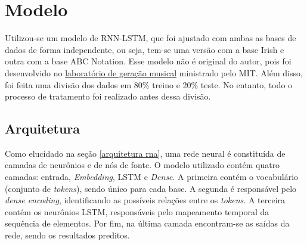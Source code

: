 \documentclass{automatextcc}
\begin{document}
\section{Modelo}
Utilizou-se um modelo de RNN-LSTM, que foi ajustado com ambas as bases de dados de forma independente, ou seja, tem-se uma versão com a base Irish e outra com a base ABC Notation. Esse modelo não é original do autor, pois foi desenvolvido no \href{https://goodboychan.github.io/python/tensorflow/mit/2021/02/14/music-generation.html\#The-Recurrent-Neural-Network-(RNN)-model}{laboratório de geração musical} ministrado pelo MIT. Além disso, foi feita uma divisão dos dados em 80\% treino e 20\% teste. No entanto, todo o processo de tratamento foi realizado antes dessa divisão.



\subsection{Arquitetura}
Como elucidado na seção \ref{arquitetura rna}, uma rede neural é constituída de camadas de neurônios e de nós de fonte. O modelo utilizado contém quatro camadas: entrada, \textit{Embedding}, LSTM e \textit{Dense}. A primeira contém o vocabulário (conjunto de \textit{tokens}), sendo único para cada base. A segunda é responsável pelo \textit{dense encoding}, identificando as possíveis relações entre os \textit{tokens}. A terceira contém os neurônios LSTM, responsáveis pelo mapeamento temporal da sequência de elementos. Por fim, na última camada encontram-se as saídas da rede, sendo os resultados preditos.



\end{document}
